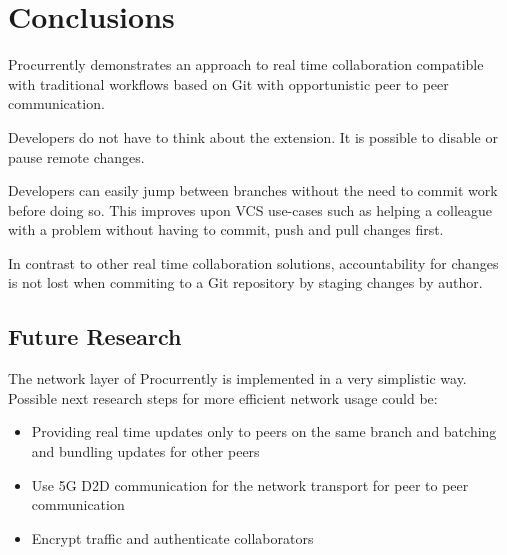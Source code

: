 \chapter{Conclusions}

Procurrently demonstrates an approach to real time collaboration compatible with traditional workflows based on Git with opportunistic peer to peer communication. 

Developers do not have to think about the extension. It is possible to disable or pause remote changes. 

Developers can easily jump between branches without the need to commit work before doing so. This improves upon VCS use-cases such as helping a colleague with a problem without having to commit, push and pull changes first. 

In contrast to other real time collaboration solutions, accountability for changes is not lost when commiting to a Git repository by staging changes by author.

\section{Future Research}

The network layer of Procurrently is implemented in a very simplistic way.
Possible next research steps for more efficient network usage could be:

\begin{itemize}
    \item Providing real time updates only to peers on the same branch and batching and bundling updates for other peers
    \item Use 5G D2D communication for the network transport for peer to peer communication \cite{TehraniUysalYanikomeroglu:2014:Device-to-devicecommunicationin5G}
    \item Encrypt traffic and authenticate collaborators
\end{itemize}